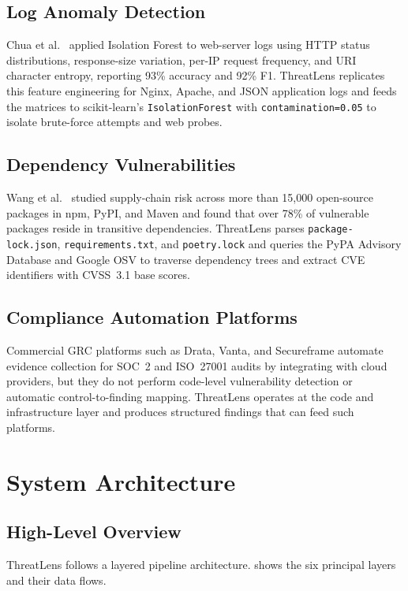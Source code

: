 \documentclass[conference]{IEEEtran}
\begin{document}
\subsection{Log Anomaly Detection}
Chua et al.~\cite{chua2024iforest} applied Isolation Forest to web-server logs
using HTTP status distributions, response-size variation, per-IP request
frequency, and URI character entropy, reporting 93\% accuracy and 92\% F1.
ThreatLens replicates this feature engineering for Nginx, Apache, and JSON
application logs and feeds the matrices to scikit-learn's
\texttt{IsolationForest} with \texttt{contamination=0.05} to isolate brute-force
attempts and web probes.

\subsection{Dependency Vulnerabilities}
Wang et al.~\cite{wang2024vulndeps} studied supply-chain risk across more than
15,000 open-source packages in npm, PyPI, and Maven and found that over 78\% of
vulnerable packages reside in transitive dependencies. ThreatLens parses
\texttt{package-lock.json}, \texttt{requirements.txt}, and \texttt{poetry.lock}
and queries the PyPA Advisory Database and Google OSV to traverse dependency
trees and extract CVE identifiers with CVSS~3.1 base scores.

\subsection{Compliance Automation Platforms}
Commercial GRC platforms such as Drata, Vanta, and Secureframe automate evidence
collection for SOC~2 and ISO~27001 audits by integrating with cloud providers,
but they do not perform code-level vulnerability detection or automatic
control-to-finding mapping. ThreatLens operates at the code and infrastructure
layer and produces structured findings that can feed such platforms.

\section{System Architecture}
\label{sec:architecture}

\subsection{High-Level Overview}
ThreatLens follows a layered pipeline architecture. 
shows the six principal layers and their data flows.
\end{document}
